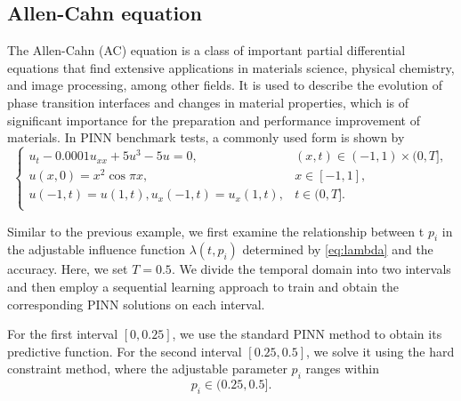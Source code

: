 \documentclass[preprint]{elsarticle}
\numberwithin{table}{section}
\numberwithin{equation}{section}
\numberwithin{figure}{section}
\begin{document}
\begin{CJK}{UTF8}{gbsn}
\subsection{Allen-Cahn 
 equation}\label{sec:Allen-Cahn equation}

 The Allen-Cahn (AC) equation is a class of important partial differential equations that find extensive applications in materials science, physical chemistry, and image processing, among other fields. It is used to describe the evolution of phase transition interfaces and changes in material properties, which is of significant importance for the preparation and performance improvement of materials. In PINN benchmark tests, a commonly used form is   shown by
\begin{equation}\label{eq:AC equation}
\begin{cases}
u_t-0.0001u_{xx}+5u^3-5u=0, &(x,t) \in (-1,1) \times  (0,T],\\
u(x,0)=x^2 \cos{\pi x},& x\in  [-1,1],   \\
u(-1,t)=u(1,t), u_x(-1,t)=u_x(1,t), & t\in  (0,T].\\
\end{cases}
\end{equation}

Similar to the previous example, we first examine the relationship between t $p_i$
 in the adjustable influence function $\lambda(t,p_i)$ determined by \eqref{eq:lambda}  and the accuracy. Here, we set $T=0.5$. We divide the temporal 
 domain into two intervals and then employ a sequential learning approach to train and obtain the corresponding PINN solutions on each interval.
  
For the first interval $[0,0.25]$, we use the standard PINN method to obtain its predictive function. For the second interval $[0.25,0.5]$, we solve it using the hard constraint method, where the adjustable parameter $p_i$
  ranges within $$p_i\in(0.25,0.5].$$


\end{CJK}
\end{document}
